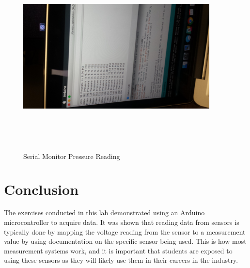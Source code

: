 \documentclass[12pt]{article}
\begin{document}
\bigskip

\begin{figure}[h!] %
    \centering
    \includegraphics[width=4in, height=4in, angle=-90]{serial_monitor_pressure_reading.jpg} 
    \caption{Serial Monitor Pressure Reading}
    \label{fig:example}
 \end{figure}

\newpage


\section*{\fontsize{12}{12}\selectfont \large Conclusion}
The exercises conducted in this lab demonstrated using an Arduino microcontroller to acquire data. It was shown that reading data from sensors is typically done by mapping the voltage reading from the sensor to a measurement value by using documentation on the specific sensor being used. This is how most measurement systems work, and it is important that students are exposed to using these sensors as they will likely use them in their careers in the industry.



%
%




\end{document}
